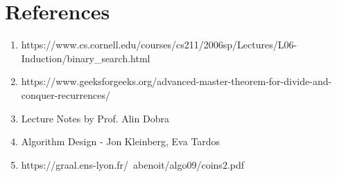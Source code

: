\documentclass[12pt]{article}
\begin{document}
\section{References}
\begin{enumerate}
    \item https://www.cs.cornell.edu/courses/cs211/2006sp/Lectures/L06-Induction/binary\_search.html
    \item https://www.geeksforgeeks.org/advanced-master-theorem-for-divide-and-conquer-recurrences/ 
    \item Lecture Notes by Prof. Alin Dobra
    \item Algorithm Design - Jon Kleinberg, Eva Tardos
    \item https://graal.ens-lyon.fr/~abenoit/algo09/coins2.pdf
\end{enumerate}
\end{document}

